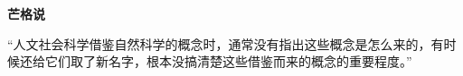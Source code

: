 \renewcommand{\bookchapter}{书单1}
\cleardoublepage
{}

\textbf{芒格说}
\par

\begin{MungerSaysBox}
{\kaishu “人文社会科学借鉴自然科学的概念时，通常没有指出这些概念是怎么来的，有时候还给它们取了新名字，根本没搞清楚这些借鉴而来的概念的重要程度。”}
\par
\end{MungerSaysBox}

\cleardoublepage





